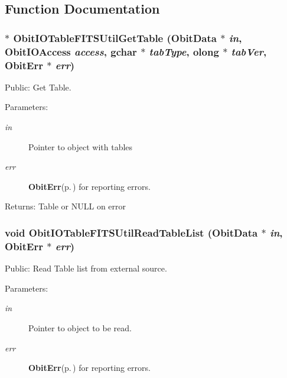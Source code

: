 \subsection{Function Documentation}
\subsubsection{$\ast$ Obit\-IOTable\-FITSUtil\-Get\-Table ({\bf Obit\-Data} $\ast$ {\em in}, Obit\-IOAccess {\em access}, gchar $\ast$ {\em tab\-Type}, {\bf olong} $\ast$ {\em tab\-Ver}, {\bf Obit\-Err} $\ast$ {\em err})}\label{ObitIOTableFITSUtil_8c_a2}


Public: Get Table. 

\begin{Desc}
\item[Parameters:]
\begin{description}
\item[{\em in}]Pointer to object with tables \item[{\em err}]{\bf Obit\-Err}{\rm (p.\,\pageref{structObitErr})} for reporting errors. \end{description}
\end{Desc}
\begin{Desc}
\item[Returns:]Table or NULL on error \end{Desc}
\subsubsection{\setlength{\rightskip}{0pt plus 5cm}void Obit\-IOTable\-FITSUtil\-Read\-Table\-List ({\bf Obit\-Data} $\ast$ {\em in}, {\bf Obit\-Err} $\ast$ {\em err})}\label{ObitIOTableFITSUtil_8c_a0}


Public: Read Table list from external source. 

\begin{Desc}
\item[Parameters:]
\begin{description}
\item[{\em in}]Pointer to object to be read. \item[{\em err}]{\bf Obit\-Err}{\rm (p.\,\pageref{structObitErr})} for reporting errors.\end{description}
\end{Desc}


